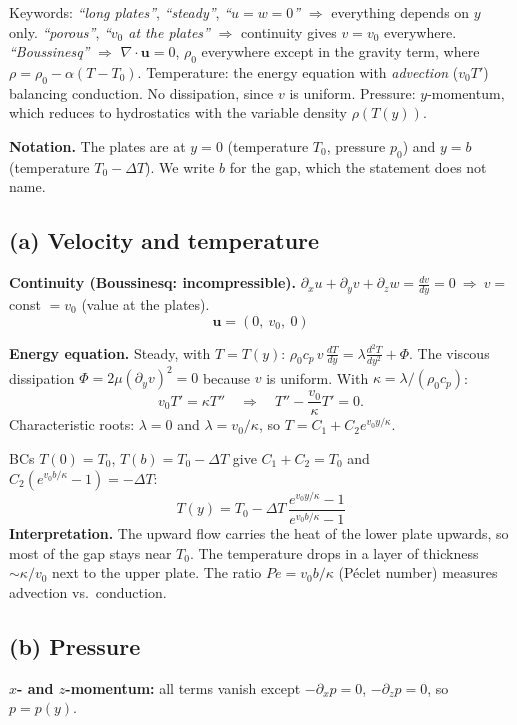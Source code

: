 \documentclass[11pt]{article}
\newcommand{\pd}{\partial}
\newcommand{\bu}{\mathbf u}
\newcommand{\kw}[1]{{\color{kw}\itshape ``#1''}}
\begin{document}
\begin{strategy}
Keywords: \kw{long plates}, \kw{steady}, \kw{$u=w=0$} $\Rightarrow$ everything depends on $y$ only.
\kw{porous}, \kw{$v_0$ at the plates} $\Rightarrow$ continuity gives $v=v_0$ everywhere.
\kw{Boussinesq} $\Rightarrow$ $\nabla\!\cdot\bu=0$, $\rho_0$ everywhere except in the gravity term, where $\rho=\rho_0-\alpha(T-T_0)$.
Temperature: the energy equation with \emph{advection} ($v_0T'$) balancing conduction. No dissipation, since $v$ is uniform.
Pressure: $y$-momentum, which reduces to hydrostatics with the variable density $\rho(T(y))$.
\end{strategy}

\textbf{Notation.} The plates are at $y=0$ (temperature $T_0$, pressure $p_0$) and $y=b$ (temperature $T_0-\Delta T$). We write $b$ for the gap, which the statement does not name.

\subsection*{(a) Velocity and temperature}
\textbf{Continuity (Boussinesq: incompressible).} $\pd_xu+\pd_yv+\pd_zw=\frac{dv}{dy}=0\ \Rightarrow\ v=$ const $=v_0$ (value at the plates).
\[
\boxed{\bu=(0,\ v_0,\ 0)}
\]

\textbf{Energy equation.} Steady, with $T=T(y)$: $\rho_0c_p\,v\,\frac{dT}{dy}=\lambda\frac{d^2T}{dy^2}+\Phi$. The viscous dissipation $\Phi=2\mu(\pd_yv)^2=0$ because $v$ is uniform. With $\kappa=\lambda/(\rho_0c_p)$:
\[
v_0T'=\kappa T''\quad\Longrightarrow\quad T''-\frac{v_0}{\kappa}T'=0 .
\]
Characteristic roots: $\lambda=0$ and $\lambda=v_0/\kappa$, so $T=C_1+C_2e^{v_0y/\kappa}$.

BCs $T(0)=T_0$, $T(b)=T_0-\Delta T$ give $C_1+C_2=T_0$ and $C_2\left(e^{v_0b/\kappa}-1\right)=-\Delta T$:
\[
\boxed{T(y)=T_0-\Delta T\,\frac{e^{v_0y/\kappa}-1}{e^{v_0b/\kappa}-1}}
\]
\textbf{Interpretation.} The upward flow carries the heat of the lower plate upwards, so most of the gap stays near $T_0$. The temperature drops in a layer of thickness $\sim\kappa/v_0$ next to the upper plate. The ratio $Pe=v_0b/\kappa$ (Péclet number) measures advection vs.\ conduction.

\subsection*{(b) Pressure}
\textbf{$x$- and $z$-momentum:} all terms vanish except $-\pd_xp=0$, $-\pd_zp=0$, so $p=p(y)$.
\end{document}
